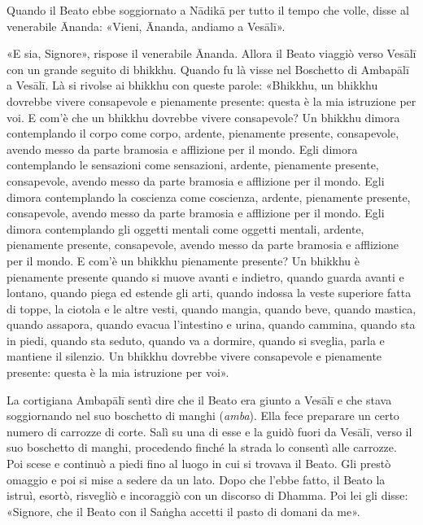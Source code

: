 

Quando il Beato ebbe soggiornato a Nādikā per tutto il tempo che volle,
disse al venerabile Ānanda: «Vieni, Ānanda, andiamo a Vesālī».


«E sia, Signore», rispose il venerabile Ānanda. Allora il Beato viaggiò
verso Vesālī con un grande seguito di bhikkhu. Quando fu là visse nel
Boschetto di Ambapālī a Vesālī. Là si rivolse ai bhikkhu con queste
parole: «Bhikkhu, un bhikkhu dovrebbe vivere consapevole e pienamente
presente: questa è la mia istruzione per voi. E com’è che un bhikkhu
dovrebbe vivere consapevole? Un bhikkhu dimora contemplando il corpo
come corpo, ardente, pienamente presente, consapevole, avendo messo da
parte bramosia e afflizione per il mondo. Egli dimora contemplando le
sensazioni come sensazioni, ardente, pienamente presente, consapevole,
avendo messo da parte bramosia e afflizione per il mondo. Egli dimora
contemplando la coscienza come coscienza, ardente, pienamente presente,
consapevole, avendo messo da parte bramosia e afflizione per il mondo.
Egli dimora contemplando gli oggetti mentali come oggetti mentali,
ardente, pienamente presente, consapevole, avendo messo da parte
bramosia e afflizione per il mondo. E com’è un bhikkhu pienamente
presente? Un bhikkhu è pienamente presente quando si muove avanti e
indietro, quando guarda avanti e lontano, quando piega ed estende gli
arti, quando indossa la veste superiore fatta di toppe, la ciotola e le
altre vesti, quando mangia, quando beve, quando mastica, quando
assapora, quando evacua l’intestino e urina, quando cammina, quando sta
in piedi, quando sta seduto, quando va a dormire, quando si sveglia,
parla e mantiene il silenzio. Un bhikkhu dovrebbe vivere consapevole e
pienamente presente: questa è la mia istruzione per voi».




La cortigiana Ambapālī sentì dire che il Beato era giunto a Vesālī e che
stava soggiornando nel suo boschetto di manghi (\emph{amba}). Ella fece
preparare un certo numero di carrozze di corte. Salì su una di esse e la
guidò fuori da Vesālī, verso il suo boschetto di manghi, procedendo
finché la strada lo consentì alle carrozze. Poi scese e continuò a piedi
fino al luogo in cui si trovava il Beato. Gli prestò omaggio e poi si
mise a sedere da un lato. Dopo che l’ebbe fatto, il Beato la istruì,
esortò, risvegliò e incoraggiò con un discorso di Dhamma. Poi lei gli
disse: «Signore, che il Beato con il Saṅgha accetti il pasto di domani
da me».


